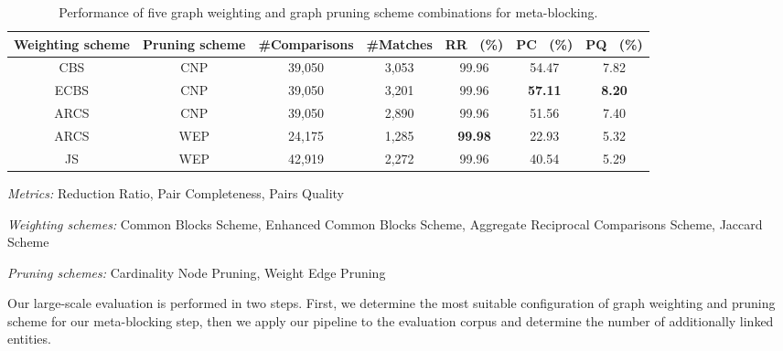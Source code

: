\begin{table}
   \caption{Performance of five graph weighting and graph pruning scheme combinations for meta-blocking.}
   \label{tab:evaluation}
   \begin{small}
   \begin{threeparttable}
   \begin{tabular}{ccccccc}
     \toprule
     Weighting scheme & Pruning scheme & \#Comparisons & \#Matches & RR\tnote{1} \ (\%) & PC\tnote{2} \ (\%) & PQ\tnote{3} \ (\%) \\
     \midrule
     CBS\tnote{4} & CNP\tnote{8} & 39,050 & 3,053 & 99.96 & 54.47 & 7.82\\
     ECBS\tnote{5} & CNP & 39,050 & 3,201 & 99.96 & \textbf{57.11} & \textbf{8.20}\\
     ARCS\tnote{6} & CNP & 39,050 & 2,890 & 99.96 & 51.56 & 7.40\\
     ARCS & WEP\tnote{9} & 24,175 & 1,285 & \textbf{99.98} & 22.93 & 5.32\\
     JS\tnote{7} & WEP & 42,919 & 2,272 & 99.96 & 40.54 & 5.29\\
   \bottomrule
 \end{tabular}
    \begin{footnotesize}
    \begin{tablenotes}
      \item[] \textit{Metrics:} \footnotemark[1]Reduction Ratio, \footnotemark[2]Pair Completeness, \footnotemark[3]Pairs Quality
      \item[] \textit{Weighting schemes:} \footnotemark[4]Common Blocks Scheme, \footnotemark[5]Enhanced Common Blocks Scheme, \footnotemark[6]Aggregate Reciprocal Comparisons Scheme, \footnotemark[7]Jaccard Scheme
      \item[] \textit{Pruning schemes:} \footnotemark[8]Cardinality Node Pruning, \footnotemark[9]Weight Edge Pruning
   \end{tablenotes}
   \end{footnotesize}
  \end{threeparttable}
  \end{small}
\end{table}

Our large-scale evaluation is performed in two steps. First, we determine the most suitable configuration of graph weighting and pruning scheme for our meta-blocking step, then we apply our pipeline to the evaluation corpus and determine the number of additionally linked entities.

